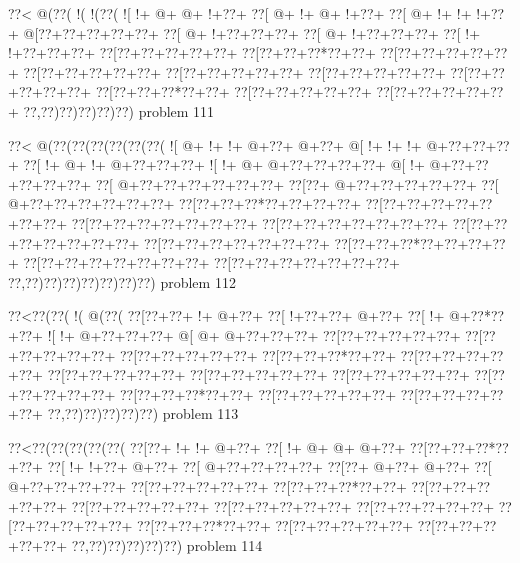 \vbox{\vbox{\goo
\0??<\- @(\0??(\- !(\- !(\0??(
\- ![\- !+\- @+\- @+\- !+\0??+
\0??[\- @+\- !+\- @+\- !+\0??+
\0??[\- @+\- !+\- !+\- !+\0??+
\- @[\0??+\0??+\0??+\0??+\0??+
\0??[\- @+\- !+\0??+\0??+\0??+
\0??[\- @+\- !+\0??+\0??+\0??+
\0??[\- !+\- !+\0??+\0??+\0??+
\0??[\0??+\0??+\0??+\0??+\0??+
\0??[\0??+\0??+\0??*\0??+\0??+
\0??[\0??+\0??+\0??+\0??+\0??+
\0??[\0??+\0??+\0??+\0??+\0??+
\0??[\0??+\0??+\0??+\0??+\0??+
\0??[\0??+\0??+\0??+\0??+\0??+
\0??[\0??+\0??+\0??+\0??+\0??+
\0??[\0??+\0??+\0??*\0??+\0??+
\0??[\0??+\0??+\0??+\0??+\0??+
\0??[\0??+\0??+\0??+\0??+\0??+
\0??,\0??)\0??)\0??)\0??)\0??)
}
\hfil problem 111\hfil\break
}

\vbox{\vbox{\goo
\0??<\- @(\0??(\0??(\0??(\0??(\0??(\0??(
\- ![\- @+\- !+\- !+\- @+\0??+\- @+\0??+
\- @[\- !+\- !+\- !+\- @+\0??+\0??+\0??+
\0??[\- !+\- @+\- !+\- @+\0??+\0??+\0??+
\- ![\- !+\- @+\- @+\0??+\0??+\0??+\0??+
\- @[\- !+\- @+\0??+\0??+\0??+\0??+\0??+
\0??[\- @+\0??+\0??+\0??+\0??+\0??+\0??+
\0??[\0??+\- @+\0??+\0??+\0??+\0??+\0??+
\0??[\- @+\0??+\0??+\0??+\0??+\0??+\0??+
\0??[\0??+\0??+\0??*\0??+\0??+\0??+\0??+
\0??[\0??+\0??+\0??+\0??+\0??+\0??+\0??+
\0??[\0??+\0??+\0??+\0??+\0??+\0??+\0??+
\0??[\0??+\0??+\0??+\0??+\0??+\0??+\0??+
\0??[\0??+\0??+\0??+\0??+\0??+\0??+\0??+
\0??[\0??+\0??+\0??+\0??+\0??+\0??+\0??+
\0??[\0??+\0??+\0??*\0??+\0??+\0??+\0??+
\0??[\0??+\0??+\0??+\0??+\0??+\0??+\0??+
\0??[\0??+\0??+\0??+\0??+\0??+\0??+\0??+
\0??,\0??)\0??)\0??)\0??)\0??)\0??)\0??)
}
\hfil problem 112\hfil\break
}

\vbox{\vbox{\goo
\0??<\0??(\0??(\- !(\- @(\0??(
\0??[\0??+\0??+\- !+\- @+\0??+
\0??[\- !+\0??+\0??+\- @+\0??+
\0??[\- !+\- @+\0??*\0??+\0??+
\- ![\- !+\- @+\0??+\0??+\0??+
\- @[\- @+\- @+\0??+\0??+\0??+
\0??[\0??+\0??+\0??+\0??+\0??+
\0??[\0??+\0??+\0??+\0??+\0??+
\0??[\0??+\0??+\0??+\0??+\0??+
\0??[\0??+\0??+\0??*\0??+\0??+
\0??[\0??+\0??+\0??+\0??+\0??+
\0??[\0??+\0??+\0??+\0??+\0??+
\0??[\0??+\0??+\0??+\0??+\0??+
\0??[\0??+\0??+\0??+\0??+\0??+
\0??[\0??+\0??+\0??+\0??+\0??+
\0??[\0??+\0??+\0??*\0??+\0??+
\0??[\0??+\0??+\0??+\0??+\0??+
\0??[\0??+\0??+\0??+\0??+\0??+
\0??,\0??)\0??)\0??)\0??)\0??)
}
\hfil problem 113\hfil\break
}

\vbox{\vbox{\goo
\0??<\0??(\0??(\0??(\0??(\0??(
\0??[\0??+\- !+\- !+\- @+\0??+
\0??[\- !+\- @+\- @+\- @+\0??+
\0??[\0??+\0??+\0??*\0??+\0??+
\0??[\- !+\- !+\0??+\- @+\0??+
\0??[\- @+\0??+\0??+\0??+\0??+
\0??[\0??+\- @+\0??+\- @+\0??+
\0??[\- @+\0??+\0??+\0??+\0??+
\0??[\0??+\0??+\0??+\0??+\0??+
\0??[\0??+\0??+\0??*\0??+\0??+
\0??[\0??+\0??+\0??+\0??+\0??+
\0??[\0??+\0??+\0??+\0??+\0??+
\0??[\0??+\0??+\0??+\0??+\0??+
\0??[\0??+\0??+\0??+\0??+\0??+
\0??[\0??+\0??+\0??+\0??+\0??+
\0??[\0??+\0??+\0??*\0??+\0??+
\0??[\0??+\0??+\0??+\0??+\0??+
\0??[\0??+\0??+\0??+\0??+\0??+
\0??,\0??)\0??)\0??)\0??)\0??)
}
\hfil problem 114\hfil\break
}

